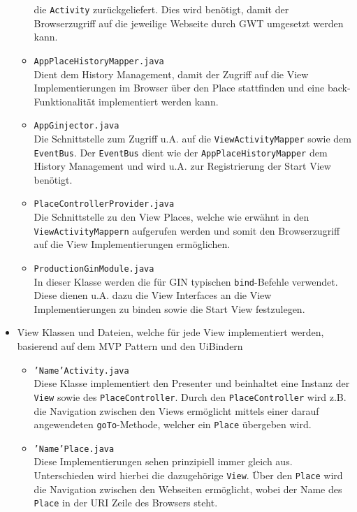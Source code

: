 \begin{itemize}
\begin{itemize}
    die \texttt{Activity} zurückgeliefert. Dies wird benötigt, damit der
    Browserzugriff auf die jeweilige Webseite durch GWT umgesetzt werden kann.
    \item \texttt{AppPlaceHistoryMapper.java}\\
    Dient dem History Management, damit der Zugriff auf die View
    Implementierungen im Browser über den Place stattfinden und eine
    back-Funktionalität implementiert werden kann.
    \item \texttt{AppGinjector.java}\\
    Die Schnittstelle zum Zugriff u.A. auf die
    \texttt{ViewActivityMapper} sowie dem \texttt{EventBus}. Der
    \texttt{EventBus} dient wie der \texttt{AppPlaceHistoryMapper} dem
    History Management und wird u.A. zur Registrierung der Start View benötigt.
    \item \texttt{PlaceControllerProvider.java}\\
    Die Schnittstelle zu den View Places, welche wie erwähnt in
    den \texttt{ViewActivityMappern} aufgerufen werden und somit den
    Browserzugriff auf die View Implementierungen ermöglichen.
    \item \texttt{ProductionGinModule.java}\\
    In dieser Klasse werden die für GIN typischen \texttt{bind}-Befehle
    verwendet. Diese dienen u.A. dazu die View Interfaces an die View
    Implementierungen zu binden sowie die Start View festzulegen.
  \end{itemize}  
  \item View Klassen und Dateien, welche für jede View implementiert werden,
  basierend auf dem MVP Pattern und den UiBindern
    \begin{itemize}
    \item \texttt{'Name'Activity.java}\\
    Diese Klasse implementiert den Presenter und beinhaltet
    eine Instanz der \texttt{View} sowie des \texttt{PlaceController}.
    Durch den \texttt{PlaceController} wird z.B. die Navigation zwischen den Views
    ermöglicht mittels einer darauf angewendeten \texttt{goTo}-Methode, welcher
 	ein \texttt{Place} übergeben wird.
    \item \texttt{'Name'Place.java}\\
    Diese Implementierungen sehen prinzipiell immer gleich aus. Unterschieden
    wird hierbei die dazugehörige \texttt{View}. Über den \texttt{Place} wird
    die Navigation zwischen den Webseiten ermöglicht, wobei der Name des
    \texttt{Place} in der URI Zeile des Browsers steht.

\end{itemize}
\end{itemize}
